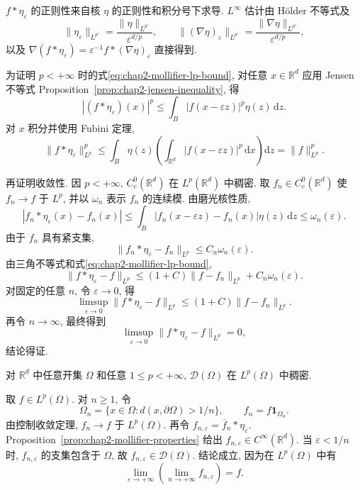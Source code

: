 \begin{Proof}
$f*\eta_\varepsilon$ 的正则性来自核 $\eta$ 的正则性和积分号下求导. $L^\infty$ 估计由 Hölder 不等式及
\[
  \|\eta_\varepsilon\|_{L^{p'}}=\frac{\|\eta\|_{L^{p'}}}{\varepsilon^{d/p}},
  \qquad
  \|(\nabla\eta)_\varepsilon\|_{L^{p'}}
  =\frac{\|\nabla\eta\|_{L^{p'}}}{\varepsilon^{d/p}},
\]
以及 $\nabla(f*\eta_\varepsilon)=\varepsilon^{-1}f*(\nabla\eta)_\varepsilon$ 直接得到.

为证明 $p<+\infty$ 时的式\eqref{eq:chap2-mollifier-lp-bound}, 对任意 $x\in\mathbb{R}^d$ 应用 Jensen 不等式 Proposition~\ref{prop:chap2-jensen-inequality}, 得
\[
  |(f*\eta_\varepsilon)(x)|^p
  \leq\int_B|f(x-\varepsilon z)|^p\eta(z)\,\mathrm{d}z.
\]
对 $x$ 积分并使用 Fubini 定理,
\[
\|f*\eta_\varepsilon\|_{L^p}^p
\leq\int_B\eta(z)\left(\int_{\mathbb{R}^d}|f(x-\varepsilon z)|^p\,\mathrm{d}x\right)\mathrm{d}z
=\|f\|_{L^p}^p.
\]

再证明收敛性. 因 $p<+\infty$, $C_c^0(\mathbb{R}^d)$ 在 $L^p(\mathbb{R}^d)$ 中稠密. 取 $f_n\in C_c^0(\mathbb{R}^d)$ 使 $f_n\to f$ 于 $L^p$, 并以 $\omega_n$ 表示 $f_n$ 的连续模. 由磨光核性质,
\[
  |f_n*\eta_\varepsilon(x)-f_n(x)|
  \leq\int_B|f_n(x-\varepsilon z)-f_n(x)|\eta(z)\,\mathrm{d}z
  \leq\omega_n(\varepsilon).
\]
由于 $f_n$ 具有紧支集,
\[
  \|f_n*\eta_\varepsilon-f_n\|_{L^p}\leq C_n\omega_n(\varepsilon).
\]
由三角不等式和式\eqref{eq:chap2-mollifier-lp-bound},
\[
\|f*\eta_\varepsilon-f\|_{L^p}
\leq(1+C)\|f-f_n\|_{L^p}+C_n\omega_n(\varepsilon).
\]
对固定的任意 $n$, 令 $\varepsilon\to0$, 得
\[
  \limsup_{\varepsilon\to0}\|f*\eta_\varepsilon-f\|_{L^p}
  \leq(1+C)\|f-f_n\|_{L^p}.
\]
再令 $n\to\infty$, 最终得到
\[
  \limsup_{\varepsilon\to0}\|f*\eta_\varepsilon-f\|_{L^p}=0,
\]
结论得证.
\end{Proof}

\begin{Theorem}
\label{thm:chap2-test-functions-dense-lp}
对 $\mathbb{R}^d$ 中任意开集 $\Omega$ 和任意 $1\leq p<+\infty$, $\mathcal{D}(\Omega)$ 在 $L^p(\Omega)$ 中稠密.
\end{Theorem}

\begin{Proof}
取 $f\in L^p(\Omega)$. 对 $n\geq1$, 令
\[
  \Omega_n=\{x\in\Omega:d(x,\partial\Omega)>1/n\},
  \qquad f_n=f\mathbf{1}_{\Omega_n}.
\]
由控制收敛定理, $f_n\to f$ 于 $L^p(\Omega)$. 再令 $f_{n,\varepsilon}=\overline f_n*\eta_\varepsilon$. Proposition~\ref{prop:chap2-mollifier-properties} 给出 $f_{n,\varepsilon}\in C^\infty(\mathbb{R}^d)$. 当 $\varepsilon<1/n$ 时, $f_{n,\varepsilon}$ 的支集包含于 $\Omega$, 故 $f_{n,\varepsilon}\in\mathcal{D}(\Omega)$. 结论成立, 因为在 $L^p(\Omega)$ 中有
\[
  \lim_{\varepsilon\to+\infty}\left(\lim_{n\to+\infty}f_{n,\varepsilon}\right)=f.
\]
\end{Proof}

